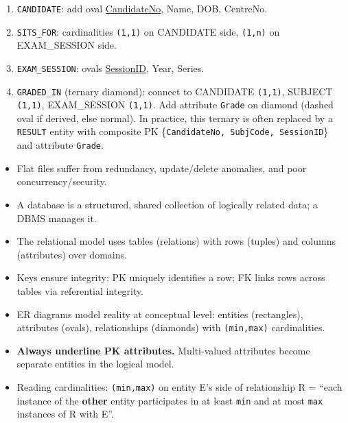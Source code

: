 \documentclass[11pt]{article}
\begin{document}
\begin{corrige}[Exercise 1]
\begin{enumerate}
    \item \texttt{CANDIDATE}: add oval \underline{CandidateNo}, Name, DOB, CentreNo.
    \item \texttt{SITS\_FOR}: cardinalities \texttt{(1,1)} on CANDIDATE side, \texttt{(1,n)} on EXAM\_SESSION side.
    \item \texttt{EXAM\_SESSION}: ovals \underline{SessionID}, Year, Series.
    \item \texttt{GRADED\_IN} (ternary diamond): connect to CANDIDATE \texttt{(1,1)}, SUBJECT \texttt{(1,1)}, EXAM\_SESSION \texttt{(1,1)}. Add attribute \texttt{Grade} on diamond (dashed oval if derived, else normal). In practice, this ternary is often replaced by a \texttt{RESULT} entity with composite PK \{\texttt{CandidateNo, SubjCode, SessionID}\} and attribute \texttt{Grade}.
\end{enumerate}
\end{corrige}

\begin{aretenir}
\begin{itemize}
    \item Flat files suffer from redundancy, update/delete anomalies, and poor concurrency/security.
    \item A database is a structured, shared collection of logically related data; a DBMS manages it.
    \item The relational model uses tables (relations) with rows (tuples) and columns (attributes) over domains.
    \item Keys ensure integrity: PK uniquely identifies a row; FK links rows across tables via referential integrity.
    \item ER diagrams model reality at conceptual level: entities (rectangles), attributes (ovals), relationships (diamonds) with \texttt{(min,max)} cardinalities.
    \item \textbf{Always underline PK attributes.} Multi-valued attributes become separate entities in the logical model.
    \item Reading cardinalities: \texttt{(min,max)} on entity E's side of relationship R = ``each instance of the \textbf{other} entity participates in at least \texttt{min} and at most \texttt{max} instances of R with E''.
\end{itemize}
\end{aretenir}
\end{document}
